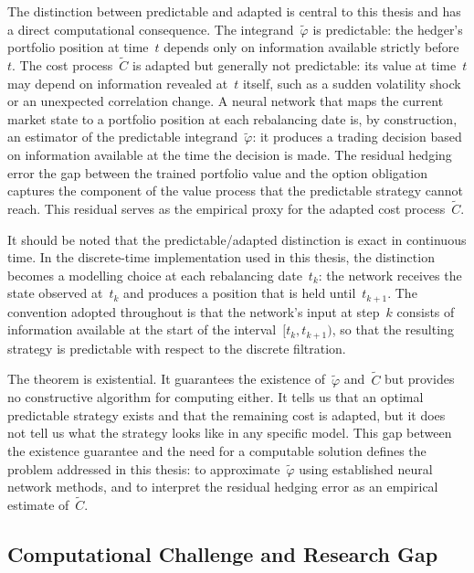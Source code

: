 The distinction between predictable and adapted is central to this thesis
and has a direct computational consequence.  The
integrand~$\tilde{\varphi}$ is predictable: the hedger's portfolio
position at time~$t$ depends only on information available strictly
before~$t$.  The cost process~$\tilde{C}$ is adapted but generally not
predictable: its value at time~$t$ may depend on information revealed
at~$t$ itself, such as a sudden volatility shock or an unexpected
correlation change.  A neural network that maps the current market state to
a portfolio position at each rebalancing date is, by construction, an
estimator of the predictable integrand~$\tilde{\varphi}$: it produces a
trading decision based on information available at the time the decision is
made.  The residual hedging error the gap between the trained portfolio
value and the option obligation captures the component of the value
process that the predictable strategy cannot reach.  This residual serves
as the empirical proxy for the adapted cost process~$\tilde{C}$.

It should be noted that the predictable/adapted distinction is exact in
continuous time.  In the discrete-time implementation used in this thesis,
the distinction becomes a modelling choice at each rebalancing date~$t_k$:
the network receives the state observed at~$t_k$ and produces a position
that is held until~$t_{k+1}$.  The convention adopted throughout is that
the network's input at step~$k$ consists of information available at the
start of the interval~$[t_k, t_{k+1})$, so that the resulting strategy is
predictable with respect to the discrete filtration.  

The theorem is existential.  It guarantees the existence
of~$\tilde{\varphi}$ and~$\tilde{C}$ but provides no constructive
algorithm for computing either.  It tells us that an optimal predictable
strategy exists and that the remaining cost is adapted, but it does not
tell us what the strategy looks like in any specific model.  This gap
between the existence guarantee and the need for a computable solution
defines the problem addressed in this thesis: to
approximate~$\tilde{\varphi}$ using established neural network methods, and
to interpret the residual hedging error as an empirical estimate
of~$\tilde{C}$.


\subsection{Computational Challenge and Research Gap}
\label{subsec:computational_challenge}

